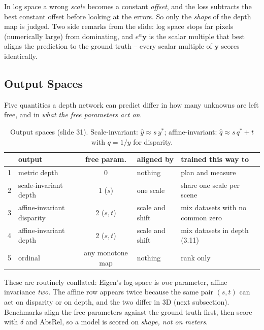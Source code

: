 \documentclass[11pt,a4paper]{article}
\theoremstyle{definition}
\theoremstyle{plain}
\theoremstyle{remark}
\begin{document}
\begin{intuition}
In log space a wrong \emph{scale} becomes a constant \emph{offset}, and the loss subtracts the best constant offset before looking at the errors. So only the \emph{shape} of the depth map is judged. Two side remarks from the slide: log space stops far pixels (numerically large) from dominating, and $e^{\alpha}\bm y$ is the scalar multiple that best aligns the prediction to the ground truth -- every scalar multiple of $\bm y$ scores identically.
\end{intuition}
 
\subsection{Output Spaces }
 
Five quantities a depth network can predict differ in how many unknowns are left free, and in \emph{what the free parameters act on}.
 
\begin{table}[htbp]
\centering\small
\begin{tabularx}{\linewidth}{@{}p{0.3cm}Ycp{3.1cm}Y@{}}
\toprule
& output & free param. & aligned by & trained this way to\\
 & metric depth & 0 & nothing & plan and measure\\
2 & scale-invariant depth & 1 ($s$) & one scale & share one scale per scene\\
3 & affine-invariant disparity & 2 ($s,t$) & scale and shift & mix datasets with no common zero\\
4 & affine-invariant depth & 2 ($s,t$) & scale and shift & mix datasets in depth (3.11)\\
5 & ordinal & any monotone map & nothing & rank only\\
\bottomrule
\end{tabularx}
\caption{Output spaces (slide 31). Scale-invariant: $\hat y\approx s\,y^\ast$; affine-invariant: $\hat q\approx s\,q^\ast+t$ with $q=1/y$ for disparity.}
\end{table}
 
These are routinely conflated: Eigen's log-space is \emph{one} parameter, affine invariance \emph{two}. The affine row appears twice because the same pair $(s,t)$ can act on disparity or on depth, and the two differ in 3D (next subsection). Benchmarks align the free parameters against the ground truth first, then score with $\delta$ and AbsRel, so a model is scored on \emph{shape, not on meters}.
 
\end{document}
